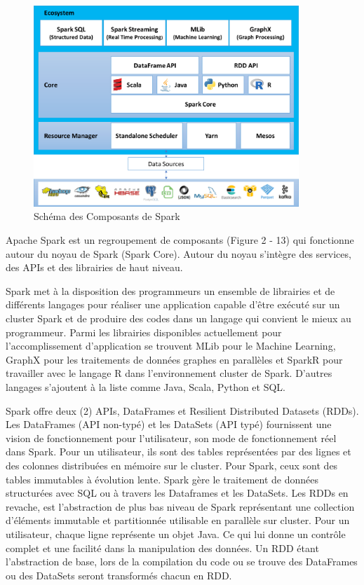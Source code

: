 \documentclass[12pt,english]{book}
\begin{document}
\begin{figure}[h]
	\centering
	\includegraphics[width=10cm]{sparkSchema}
	\caption{Schéma des Composants de Spark}
\end{figure}

Apache Spark est un regroupement de composants (Figure 2 - 13) qui fonctionne autour du noyau de Spark (Spark Core).
Autour du noyau s’intègre des services, des APIs et des librairies de haut niveau.

Spark met à la disposition des programmeurs un ensemble de librairies et de différents langages pour réaliser une application capable d’être exécuté sur un cluster Spark et de produire des codes dans un langage qui convient le mieux au programmeur.
Parmi les librairies disponibles actuellement pour l’accomplissement d’application se trouvent MLib pour le Machine Learning, GraphX pour les traitements de données graphes en parallèles et SparkR pour travailler avec le langage R dans l’environnement cluster de Spark.
D’autres langages s’ajoutent à la liste comme Java, Scala, Python et SQL.

Spark offre deux (2) APIs, DataFrames et Resilient Distributed Datasets (RDDs). Les DataFrames (API non-typé) et les DataSets (API typé) fournissent une vision de fonctionnement pour l’utilisateur, son mode de fonctionnement réel dans Spark.
Pour un utilisateur, ils sont des tables représentées par des lignes et des colonnes distribuées en mémoire sur le cluster.
Pour Spark, ceux sont des tables immutables à évolution lente.
Spark gère le traitement de données structurées avec SQL ou à travers les Dataframes et les DataSets.
Les RDDs en revache, est l’abstraction de plus bas niveau de Spark représentant une collection d’éléments immutable et partitionnée utilisable en parallèle sur cluster.
Pour un utilisateur, chaque ligne représente un objet Java.
Ce qui lui donne un contrôle complet et une facilité dans la manipulation des données.
Un RDD étant l’abstraction de base, lors de la compilation du code ou se trouve des DataFrames ou des DataSets seront transformés chacun en RDD.
\end{document}
